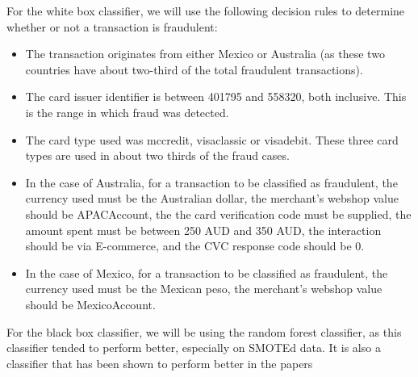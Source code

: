 \documentclass[]{article}
\begin{document}
For the white box classifier, we will use the following decision rules to determine whether or not a transaction is fraudulent:
\begin{itemize}
	\item The transaction originates from either Mexico or Australia (as these two countries have about two-third of the total fraudulent transactions).
	\item The card issuer identifier is between 401795 and 558320, both inclusive. This is the range in which fraud was detected.
	\item The card type used was mccredit, visaclassic or visadebit. These three card types are used in about two thirds of the fraud cases.
	\item In the case of Australia, for a transaction to be classified as fraudulent, the currency used must be the Australian dollar, the merchant's webshop value should be APACAccount, the the card verification code must be supplied, the amount spent must be between 250 AUD and 350 AUD, the interaction should be via E-commerce, and the CVC response code should be 0.
	\item In the case of Mexico, for a transaction to be classified as fraudulent, the currency used must be the Mexican peso, the merchant's webshop value should be MexicoAccount.
\end{itemize}
For the black box classifier, we will be using the random forest classifier, as this classifier tended to perform better, especially on SMOTEd data. It is also a classifier that has been shown to perform better in the papers
\end{document}
